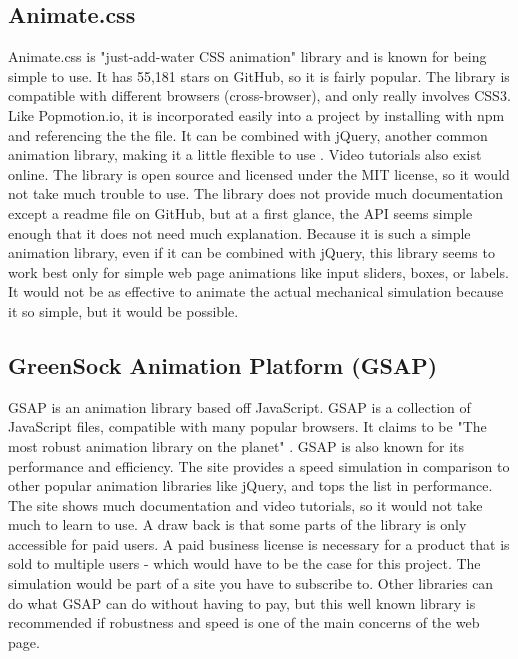 \documentclass[capstone.tex]{subfiles}
\begin{document}
\subsection{Animate.css}
Animate.css is "just-add-water CSS animation" library and is known for being simple to use.
It has 55,181 stars on GitHub, so it is fairly popular. The library is compatible with different browsers (cross-browser), and only really involves CSS3. Like Popmotion.io, it is incorporated easily into a project by installing with npm and referencing the the file. It can be combined with jQuery, another common animation library, making it a little flexible to use \cite{animate}.
Video tutorials also exist online. The library is open source and licensed under the MIT license, so it would not take much trouble to use.
The library does not provide much documentation except a readme file on GitHub, but at a first glance, the API seems simple enough that it does not need much explanation. Because it is such a simple animation library, even if it can be combined with jQuery, this library seems to work best only for simple web page animations like input sliders, boxes, or labels. It would not be as effective to animate the actual mechanical simulation because it so simple, but it would be possible. 

\subsection{GreenSock Animation Platform (GSAP)}
GSAP is an animation library based off JavaScript. GSAP is a collection of JavaScript files, compatible with many popular browsers. It claims to be "The most robust animation library on the planet" \cite{gsap}. 
GSAP is also known for its performance and efficiency. The site provides a speed simulation in comparison to other popular animation libraries like jQuery, and tops the list in performance.  
The site shows much documentation and video tutorials, so it would not take much to learn to use. 
A draw back is that some parts of the library is only accessible for paid users. A paid business license is necessary for a product that is sold to multiple users - which would have to be the case for this project. The simulation would be part of a site you have to subscribe to. Other libraries can do what GSAP can do without having to pay, but this well known library is recommended if robustness and speed is one of the main concerns of the web page. \cite{gsap}
\end{document}
